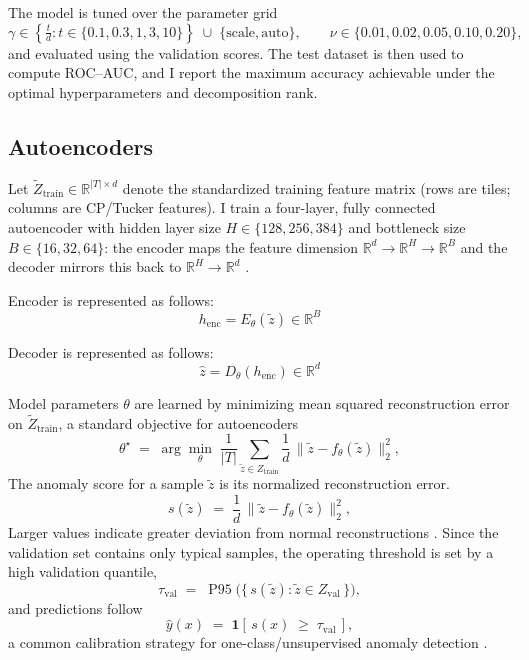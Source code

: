 \documentclass[11pt]{article}
\begin{document}
\noindent The model is tuned over the parameter grid \[
\gamma \in \left\{ \tfrac{t}{d} : t \in \{0.1, 0.3, 1, 3, 10\} \right\}
\;\cup\; \{\text{scale}, \text{auto}\}, \qquad
\nu \in \{0.01, 0.02, 0.05, 0.10, 0.20\},
\]
and evaluated using the validation scores. The test dataset is then used to compute ROC–AUC, and I report the maximum accuracy achievable under the optimal hyperparameters and decomposition rank.


\subsection{Autoencoders}

\noindent Let \(\tilde{Z}_{\text{train}}\in\mathbb{R}^{|T|\times d}\) denote the standardized training feature matrix (rows are tiles; columns are CP/Tucker features). I train a four-layer, fully connected autoencoder with hidden layer size \(H\in\{128,256,384\}\) and bottleneck size \(B\in\{16,32,64\}\): the encoder maps the feature dimension \(\mathbb{R}^{d}\!\to\!\mathbb{R}^{H}\!\to\!\mathbb{R}^{B}\) and the decoder mirrors this back to \(\mathbb{R}^{H}\!\to\!\mathbb{R}^{d}\) \citep{Hinton2006,Goodfellow2016}.

\noindent Encoder is represented as follows:
\[
h_{\text{enc}} = E_{\theta}(\tilde{z}) \in \mathbb{R}^{B}
\]

\noindent Decoder is represented as follows:
\[
\hat{z} = D_{\theta}(h_{\text{enc}}) \in \mathbb{R}^{d}
\]

\noindent Model parameters \(\theta\) are learned by minimizing mean squared reconstruction error on \(\tilde{Z}_{\text{train}}\), a standard objective for autoencoders \citep{Hinton2006,Goodfellow2016}
\[
\theta^{\star}
\;=\;
\arg\min_{\theta}\;
\frac{1}{|T|}\sum_{\tilde{z}\in Z_{\text{train}}}
\frac{1}{d}\,\big\lVert \tilde{z} - f_{\theta}(\tilde{z}) \big\rVert_{2}^{2},
\]
\noindent The anomaly score for a sample \(\tilde{z}\) is its normalized reconstruction error.
\[
s(\tilde{z})
\;=\;
\frac{1}{d}\,\big\lVert \tilde{z} - f_{\theta}(\tilde{z}) \big\rVert_{2}^{2},
\]
\noindent Larger values indicate greater deviation from normal reconstructions \citep{Sakurada2014,ZhouPaffenroth2017}. Since the validation set contains only typical samples, the operating threshold is set by a high validation quantile,
\[
\tau_{\text{val}} \;=\; \operatorname{P95}\!\big( \{\, s(\tilde{z}) : \tilde{z}\in Z_{\text{val}} \,\} \big),
\]
\noindent and predictions follow
\[
\hat{y}(x) \;=\; \mathbf{1}\!\left[\, s(x) \;\ge\; \tau_{\text{val}} \,\right],
\]
\noindent a common calibration strategy for one-class/unsupervised anomaly detection \citep{Chandola2009,Campos2016,Ruff2021}.
\end{document}
